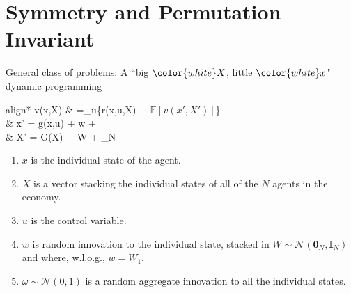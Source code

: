 \documentclass[aspectratio=169,10pt]{beamer}
\newcommand{\expec}[2][]{\ensuremath{\mathbb{E}_{{#1}}\left[ {#2} \right]}}
\begin{document}
\section{\textcolor{PennBlue}{Symmetry and Permutation Invariant}}

\begin{frame}{General class of problems: A ``big $\color{white}X$, little $\color{white}x$" dynamic programming}
	\begin{empheq}[box=\tcbhighmath]{align*}
		v(x,X)       & =\max_{u}\left\{r\big(x,u,X\big) + \beta \expec{v(x',X')}\right\} \\
		 & x' = g(x,u) + \sigma w + \eta \omega                              \\
					& X' = G(X) + \Omega W + \eta \omega {}_N
	\end{empheq}
	\begin{enumerate}
		\item $x$ is the individual state of the agent.
		\vspace{0.1in}
		\item $X$ is a vector stacking the individual states of all of the $N$ agents in the economy.
		\vspace{0.1in}
		\item $u$ is the control variable.
		\vspace{0.1in}
		\item $w$ is random innovation to the individual state, stacked in $W \sim \mathcal{N}(\mathbf{0}_N,\mathbf{I}_N)$ and where, w.l.o.g., $w = W_1$.
		\vspace{0.1in}
		\item $\omega \sim \mathcal{N}(0,1)$ is a random aggregate innovation to all the individual states.
		
	\end{enumerate}
	
\end{frame}
\end{document}
